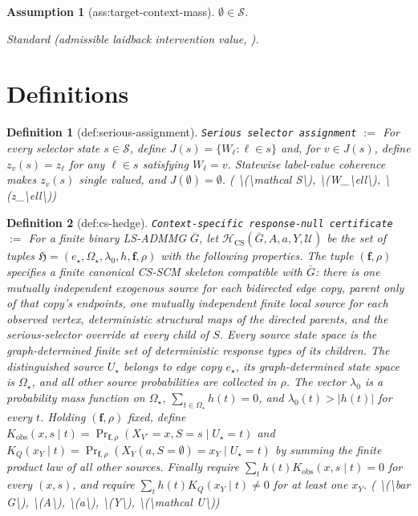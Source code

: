 \documentclass{article}
\newtheorem{assumption}{Assumption}
\newtheorem{definition}{Definition}
\begin{document}
\begin{assumption}[ass:target-context-mass]\label{ass:target-context-mass}
\(\emptyset\in\mathcal S\).
\par\smallskip\noindent\emph{Standard} (admissible laidback intervention value, \cite{LeeGhassamiShpitser2024Systematic}).
\end{assumption}

\section{Definitions}

\begin{definition}[def:serious-assignment]\label{def:serious-assignment}
\texttt{Serious selector assignment} $:=$ For every selector state \(s\in\mathcal S\), define \(J(s)=\{W_\ell:\ell\in s\}\) and, for \(v\in J(s)\), define \(z_v(s)=z_\ell\) for any \(\ell\in s\) satisfying \(W_\ell=v\). Statewise label-value coherence makes \(z_v(s)\) single valued, and \(J(\emptyset)=\emptyset\). \quad ( \textbackslash{}(\textbackslash{}mathcal S\textbackslash{}), \textbackslash{}(W\_\textbackslash{}ell\textbackslash{}), \textbackslash{}(z\_\textbackslash{}ell\textbackslash{}))
\end{definition}

\begin{definition}[def:cs-hedge]\label{def:cs-hedge}
\texttt{Context-specific response-null certificate} $:=$ For a finite binary LS-ADMMG \(\bar G\), let \(\mathcal H_{\mathrm{CS}}(\bar G,A,a,Y,\mathcal U)\) be the set of tuples \(\mathfrak H=(e_\star,\Omega_\star,\lambda_0,h,\mathbf f,\rho)\) with the following properties. The tuple \((\mathbf f,\rho)\) specifies a finite canonical CS-SCM skeleton compatible with \(\bar G\): there is one mutually independent exogenous source for each bidirected edge copy, parent only of that copy's endpoints, one mutually independent finite local source for each observed vertex, deterministic structural maps of the directed parents, and the serious-selector override at every child of \(S\). Every source state space is the graph-determined finite set of deterministic response types of its children. The distinguished source \(U_\star\) belongs to edge copy \(e_\star\), its graph-determined state space is \(\Omega_\star\), and all other source probabilities are collected in \(\rho\). The vector \(\lambda_0\) is a probability mass function on \(\Omega_\star\), \(\sum_{t\in\Omega_\star}h(t)=0\), and \(\lambda_0(t)>|h(t)|\) for every \(t\). Holding \((\mathbf f,\rho)\) fixed, define \(K_{\mathrm{obs}}(x,s\mid t)=\Pr_{\mathbf f,\rho}(X_{V^\circ}=x,S=s\mid U_\star=t)\) and \(K_Q(x_Y\mid t)=\Pr_{\mathbf f,\rho}(X_Y(a,S=\emptyset)=x_Y\mid U_\star=t)\) by summing the finite product law of all other sources. Finally require \(\sum_t h(t)K_{\mathrm{obs}}(x,s\mid t)=0\) for every \((x,s)\), and require \(\sum_t h(t)K_Q(x_Y\mid t)\ne0\) for at least one \(x_Y\). \quad ( \textbackslash{}(\textbackslash{}bar G\textbackslash{}), \textbackslash{}(A\textbackslash{}), \textbackslash{}(a\textbackslash{}), \textbackslash{}(Y\textbackslash{}), \textbackslash{}(\textbackslash{}mathcal U\textbackslash{}))
\end{definition}
\end{document}
